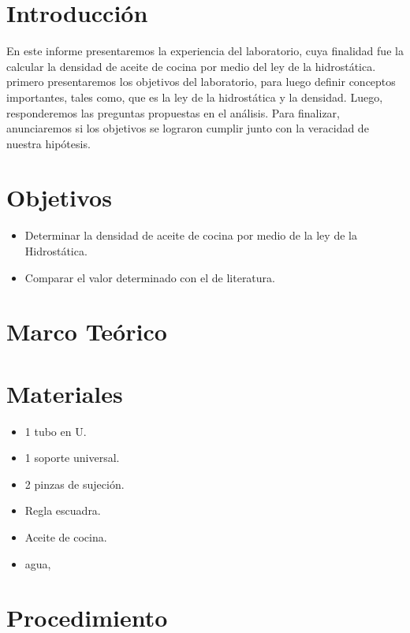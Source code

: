 \documentclass[a4paper, 12p]{article}
\begin{document}
\section{Introducción}
En este informe presentaremos la experiencia del laboratorio, cuya finalidad fue la calcular la densidad de aceite de cocina por medio del ley de la hidrostática. primero presentaremos los objetivos del laboratorio, para luego definir conceptos importantes, tales como, que es la ley de la hidrostática y la densidad. Luego, responderemos las preguntas propuestas en el análisis. Para finalizar, anunciaremos si los objetivos se lograron cumplir junto con la veracidad de nuestra hipótesis.

\section{Objetivos}
\begin{itemize}
      \item Determinar la densidad de aceite de cocina por medio de la ley de la Hidrostática.
      
      \item Comparar el valor determinado con el de literatura.
\end{itemize}



\section{Marco Teórico} 



\section{Materiales}


\begin{itemize}
      \item 1 tubo en U.
      \item 1 soporte universal.
      \item 2 pinzas de sujeción.
      \item Regla escuadra.
      \item Aceite de cocina.
      \item agua,
\end{itemize}

\section{Procedimiento}
\end{document}

